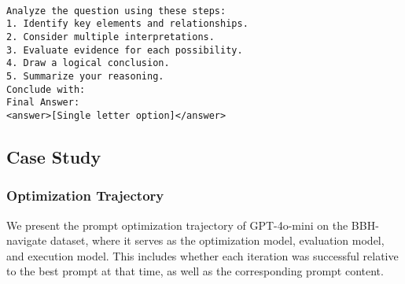 \begin{tcolorbox}[title={\textbf{\small WSC Prompt}}, boxrule=2pt, arc=0mm, breakable]
\begin{verbatim}

Analyze the question using these steps:
1. Identify key elements and relationships.
2. Consider multiple interpretations.
3. Evaluate evidence for each possibility.
4. Draw a logical conclusion.
5. Summarize your reasoning.
Conclude with:
Final Answer:
<answer>[Single letter option]</answer>

\end{verbatim}
\end{tcolorbox}


\subsection{Case Study}
\label{appendix:case-study}
\subsubsection{Optimization Trajectory}
\label{appendix:trajectory}
We present the prompt optimization trajectory of GPT-4o-mini on the BBH-navigate dataset, where it serves as the optimization model, evaluation model, and execution model. This includes whether each iteration was successful relative to the best prompt at that time, as well as the corresponding prompt content.

\newcommand{\successbox}[2]{%
    \begin{tcolorbox}[
        title={\textbf{\small Iteration #1 - Success}},
        colframe=green!40!black!90!white,    
        colback=green!10!white!95!black,    
        coltitle=white,
        colbacktitle=green!40!black!90!white,
        boxrule=2pt,
        arc=0mm,
        left=8pt,
        right=8pt,
        top=8pt,
        bottom=8pt,
        fonttitle=\sffamily\bfseries,
        verbatim
    ]
    #2
    \end{tcolorbox}
}

\newcommand{\failedbox}[2]{%
    \begin{tcolorbox}[
        title={\textbf{\small Iteration #1 - Failed}},
        colframe=red!40!black!90!white,      
        colback=red!10!white!95!black,       
        coltitle=white,
        colbacktitle=red!40!black!90!white,  
        boxrule=2pt,
        arc=0mm,
        left=8pt,
        right=8pt,
        top=8pt,
        bottom=8pt,
        fonttitle=\sffamily\bfseries,
        verbatim
    ]
    #2
    \end{tcolorbox}
}



